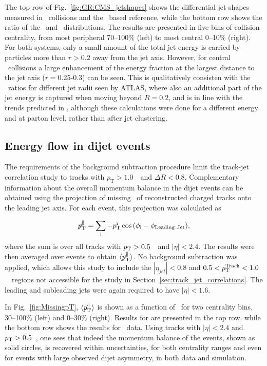 The top row of Fig.~\ref{fig:GR:CMS_jetshapes} shows the differential jet shapes measured in \PbPb\ 
collisions and the \pp\ based reference, while the bottom row shows the ratio of the \PbPb\ and \pp\ 
distributions. The results are presented in five bins of collision centrality, from
most peripheral 70--100\% (left) to most central 0--10\% (right). For 
both systems, only a small amount of the total jet energy 
is carried by particles more than  $r> 0.2$ away from the jet axis. However, for central 
\PbPb\ collisions a large enhancement of the energy fraction at the largest distance
to the jet axis ($r = $0.25-0.3) can be seen.
This is qualitatively consisten with the \Rcp\ ratios for different jet radii seen by ATLAS, 
where also an additional part of the jet energy is captured when moving beyond $R = 0.2$, and is 
in line with the trends predicted in \cite{Vitev,Renk:2009hv}, although these calculations were
done for a different energy and at parton level, rather than after jet clustering.

\subsection{Energy flow in dijet events}

The requirements of the background subtraction procedure limit the track-jet correlation study
to tracks with $p_{\mathrm{T}} > 1.0$~\GeVc\  and $\Delta R < 0.8$. Complementary information about the
overall momentum balance in the dijet events can be obtained using the projection of missing
\pt\ of reconstructed charged tracks onto the leading jet axis. For each event, this
projection was calculated as

\begin{equation}
\displaystyle{\not} p_{\mathrm{T}}^{\parallel} =
\sum_{\rm i}{ -p_{\mathrm{T}}^{\rm i}\cos{(\phi_{\rm i}-\phi_{\rm Leading\ Jet})}},
\end{equation}
where the sum is over all tracks with $p_{\rm{T}} > 0.5$~\GeVc\ and $|\eta| < 2.4$. The results were
then averaged over events to obtain $\langle \displaystyle{\not} p_{\mathrm{T}}^{\parallel} \rangle$.
No background subtraction was applied, which allows this study to include the $|\eta_{jet}| < 0.8$ and 
$0.5 < p_{\mathrm{T}}^{\rm Track} < 1.0$~\GeVc\ regions not accessible for the study in Section~\ref{sec:track_jet_correlations}.
The leading and subleading jets were again required to have $|\eta| < 1.6$.

In Fig.~\ref{fig:MissingpT}, $\langle \displaystyle{\not} p_{\mathrm{T}}^{\parallel} \rangle$
is shown as a function of \AJ\ for two centrality bins, 30--100\% (left) and 0--30\% (right).
Results for {\sc{pythia+hydjet}} are presented in the top row, while the bottom row shows the results
for \PbPb\ data.
Using tracks with $|\eta| < 2.4$ and $p_{\rm{T}} > 0.5$~\GeVc, one sees
that indeed the momentum balance of the events, shown as solid circles, is recovered within uncertainties,
for both centrality ranges and even for events with large observed dijet asymmetry, in both data and simulation.

